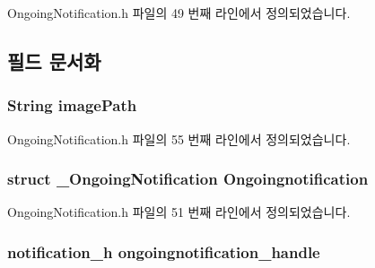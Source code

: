Ongoing\-Notification.\-h 파일의 49 번째 라인에서 정의되었습니다.



\subsection{필드 문서화}
\hypertarget{struct___ongoing_notification_extend_a7480fd65ec0c3010b75b111ed2611adb}{
\subsubsection[{image\-Path}]{\setlength{\rightskip}{0pt plus 5cm}String image\-Path}}\label{struct___ongoing_notification_extend_a7480fd65ec0c3010b75b111ed2611adb}


Ongoing\-Notification.\-h 파일의 55 번째 라인에서 정의되었습니다.

\hypertarget{struct___ongoing_notification_extend_ae6e96ac9bd41838e84b87ca988c9bf29}{
\subsubsection[{Ongoingnotification}]{\setlength{\rightskip}{0pt plus 5cm}struct {\bf \-\_\-\-Ongoing\-Notification} Ongoingnotification}}\label{struct___ongoing_notification_extend_ae6e96ac9bd41838e84b87ca988c9bf29}


Ongoing\-Notification.\-h 파일의 51 번째 라인에서 정의되었습니다.

\hypertarget{struct___ongoing_notification_extend_a51c003647fa5a319570219a88a5672ec}{
\subsubsection[{ongoingnotification\-\_\-handle}]{\setlength{\rightskip}{0pt plus 5cm}notification\-\_\-h ongoingnotification\-\_\-handle}}\label{struct___ongoing_notification_extend_a51c003647fa5a319570219a88a5672ec}


